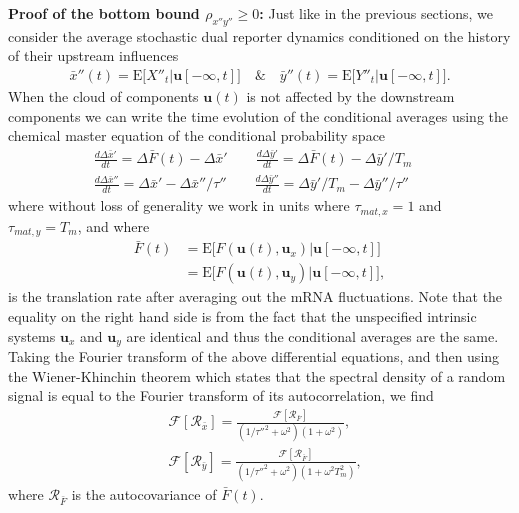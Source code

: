 \documentclass[%
 reprint,prx,
superscriptaddress,
%
%
%
%
%
%
%
%
%
 amsmath,amssymb,
 aps,
%
%
%
%
%
%
]{revtex4-2}
\begin{document}
{\noindent \textbf{Proof of the bottom bound $\rho_{x''y''} \geq 0$:} Just like in the previous sections, we consider the average stochastic dual reporter dynamics conditioned on
the history of their upstream influences 
\begin{align*}
\bar{x}''(t) = \mathrm{E}\big[ X''_{t}|\mathbf{u}[-\infty,t] \big] \quad \text{\&} \quad  \bar{y}''(t) = \mathrm{E} \big[ Y''_{t}|\mathbf{u}[-\infty,t] \big] .
\end{align*}
When the cloud of components $\mathbf{u}(t)$ is not affected by the downstream components we can write the time evolution of the conditional averages using the chemical 
master equation of the conditional probability space
\begin{align*}
 \frac{d\Delta \bar{x}'}{dt} = \Delta \bar{F}(t) - \Delta \bar{x}' \qquad \frac{d \Delta \bar{y}'}{dt} = \Delta \bar{F}(t) - \Delta \bar{y}'/T_{m} \quad\\
 \frac{d\Delta \bar{x}''}{dt} = \Delta \bar{x}' - \Delta \bar{x}''/\tau''  \qquad \frac{d\Delta \bar{y}''}{dt} = \Delta \bar{y}'/T_{m} - \Delta \bar{y}''/\tau'' 
\end{align*}
where without loss of generality we work in units where $\tau_{mat,x} = 1$ and $\tau_{mat,y} = T_{m}$, and where 
\begin{align*}
\bar{F}(t) &= \mathrm{E}\big[F(\mathbf{u}(t),\mathbf{u}_{x})|\mathbf{u}[-\infty,t]\big] \\
&=  \mathrm{E}\big[F(\mathbf{u}(t),\mathbf{u}_{y})|\mathbf{u}[-\infty,t]\big] ,
\end{align*}
is the translation rate after averaging out the mRNA fluctuations. Note that the equality on the right hand side is from the fact that the unspecified intrinsic systems $\mathbf{u}_{x}$ and $\mathbf{u}_{y}$ are identical and thus the conditional averages are the same. 
Taking the Fourier transform of the above differential equations, and then using the Wiener-Khinchin theorem \cite{davenport1958introduction} which states that the spectral density of a random signal is equal to the Fourier transform of its autocorrelation, we find
\begin{align*}
 &\mathcal{F}[\mathcal{R}_{\bar{x}}] = \frac{\mathcal{F}[\mathcal{R}_{\bar{F}}]}{(1/\tau''^{2} + \omega^{2})(1 + \omega^{2})}, \\
 &\mathcal{F}[\mathcal{R}_{\bar{y}}] = \frac{\mathcal{F}[\mathcal{R}_{\bar{F}}]}{(1/\tau''^{2} + \omega^{2})(1 + \omega^{2}T_{m}^{2})},
\end{align*}
where $\mathcal{R}_{\bar{F}}$ is the autocovariance of $\bar{F}(t)$. 
}
\end{document}
